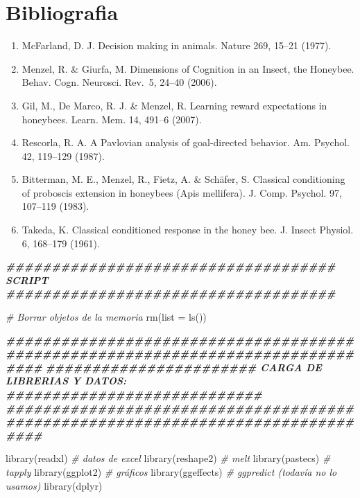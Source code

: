 \documentclass[
]{article}
\newenvironment{Shaded}{\begin{snugshade}}{\end{snugshade}}
\newcommand{\AttributeTok}[1]{\textcolor[rgb]{0.77,0.63,0.00}{#1}}
\newcommand{\CommentTok}[1]{\textcolor[rgb]{0.56,0.35,0.01}{\textit{#1}}}
\newcommand{\DocumentationTok}[1]{\textcolor[rgb]{0.56,0.35,0.01}{\textbf{\textit{#1}}}}
\newcommand{\FunctionTok}[1]{\textcolor[rgb]{0.00,0.00,0.00}{#1}}
\newcommand{\NormalTok}[1]{#1}
\providecommand{\tightlist}{%
  \setlength{\itemsep}{0pt}\setlength{\parskip}{0pt}}
\begin{document}
\hypertarget{bibliografia}{%
\section{Bibliografia}\label{bibliografia}}

\begin{enumerate}
\def\labelenumi{\arabic{enumi}.}
\tightlist
\item
  McFarland, D. J. Decision making in animals. Nature 269, 15--21
  (1977).
\item
  Menzel, R. \& Giurfa, M. Dimensions of Cognition in an Insect, the
  Honeybee. Behav. Cogn. Neurosci. Rev.~5, 24--40 (2006).
\item
  Gil, M., De Marco, R. J. \& Menzel, R. Learning reward expectations in
  honeybees. Learn. Mem. 14, 491--6 (2007).
\item
  Rescorla, R. A. A Pavlovian analysis of goal-directed behavior. Am.
  Psychol. 42, 119--129 (1987).
\item
  Bitterman, M. E., Menzel, R., Fietz, A. \& Schäfer, S. Classical
  conditioning of proboscis extension in honeybees (Apis mellifera). J.
  Comp. Psychol. 97, 107--119 (1983).
\item
  Takeda, K. Classical conditioned response in the honey bee. J. Insect
  Physiol. 6, 168--179 (1961).
\end{enumerate}

\begin{Shaded}
\begin{Highlighting}[]
\DocumentationTok{\#\#\#\#\#\#\#\#\#\#\#\#\#\#\#\#\#\#\#\#\#\#\#\#\#\#\#\#\#\#\#\#\#\#\#\# SCRIPT \#\#\#\#\#\#\#\#\#\#\#\#\#\#\#\#\#\#\#\#\#\#\#\#\#\#\#\#\#\#\#\#\#\#\#\#}

\CommentTok{\# Borrar objetos de la memoria}
\FunctionTok{rm}\NormalTok{(}\AttributeTok{list =} \FunctionTok{ls}\NormalTok{()) }

\DocumentationTok{\#\#\#\#\#\#\#\#\#\#\#\#\#\#\#\#\#\#\#\#\#\#\#\#\#\#\#\#\#\#\#\#\#\#\#\#\#\#\#\#\#\#\#\#\#\#\#\#\#\#\#\#\#\#\#\#\#\#\#\#\#\#\#\#\#\#\#\#\#\#\#\#\#\#\#\#\#\#\#\#}
\DocumentationTok{\#\#\#\#\#\#\#\#\#\#\#\#\#\#\#\#\#\#\#\#\#\#\# CARGA DE LIBRERIAS Y DATOS: \#\#\#\#\#\#\#\#\#\#\#\#\#\#\#\#\#\#\#\#\#\#\#\#\#\#\#\#}
\DocumentationTok{\#\#\#\#\#\#\#\#\#\#\#\#\#\#\#\#\#\#\#\#\#\#\#\#\#\#\#\#\#\#\#\#\#\#\#\#\#\#\#\#\#\#\#\#\#\#\#\#\#\#\#\#\#\#\#\#\#\#\#\#\#\#\#\#\#\#\#\#\#\#\#\#\#\#\#\#\#\#\#\#}

\FunctionTok{library}\NormalTok{(readxl)    }\CommentTok{\# datos de excel}
\FunctionTok{library}\NormalTok{(reshape2)  }\CommentTok{\# melt}
\FunctionTok{library}\NormalTok{(pastecs)   }\CommentTok{\# tapply}
\FunctionTok{library}\NormalTok{(ggplot2)   }\CommentTok{\# gráficos}
\FunctionTok{library}\NormalTok{(ggeffects) }\CommentTok{\# ggpredict (todavía no lo usamos)}
\FunctionTok{library}\NormalTok{(dplyr)}
\end{Highlighting}
\end{Shaded}
\end{document}
